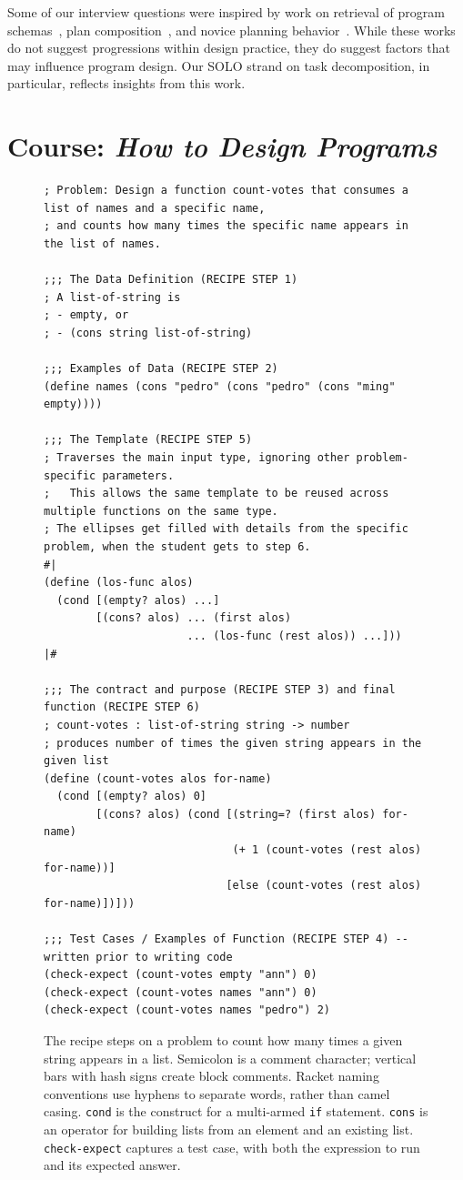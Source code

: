Some of our interview questions were inspired by work on retrieval of
program schemas~\cite{Pirolli_Anderson_1985,Spohrer_Soloway_1989},
plan composition~\cite{soloway-learning86}, and novice planning
behavior~\cite{Rist_1989,Rist_1991}.  While these works do not suggest
progressions within design practice, they do suggest factors that may
influence program design. Our SOLO strand on task decomposition, in
particular, reflects insights from this work.

\section{Course: \textit{How to Design Programs}}

\begin{figure}
\begin{lstlisting}
; Problem: Design a function count-votes that consumes a list of names and a specific name,
; and counts how many times the specific name appears in the list of names.

;;; The Data Definition (RECIPE STEP 1)
; A list-of-string is
; - empty, or
; - (cons string list-of-string)

;;; Examples of Data (RECIPE STEP 2)
(define names (cons "pedro" (cons "pedro" (cons "ming" empty))))

;;; The Template (RECIPE STEP 5)
; Traverses the main input type, ignoring other problem-specific parameters.
;   This allows the same template to be reused across multiple functions on the same type.
; The ellipses get filled with details from the specific problem, when the student gets to step 6.
#|
(define (los-func alos)
  (cond [(empty? alos) ...]
        [(cons? alos) ... (first alos)
                      ... (los-func (rest alos)) ...]))
|#

;;; The contract and purpose (RECIPE STEP 3) and final function (RECIPE STEP 6)
; count-votes : list-of-string string -> number
; produces number of times the given string appears in the given list
(define (count-votes alos for-name)
  (cond [(empty? alos) 0]
        [(cons? alos) (cond [(string=? (first alos) for-name)
                             (+ 1 (count-votes (rest alos) for-name))]
                            [else (count-votes (rest alos) for-name)])]))

;;; Test Cases / Examples of Function (RECIPE STEP 4) -- written prior to writing code
(check-expect (count-votes empty "ann") 0)
(check-expect (count-votes names "ann") 0)
(check-expect (count-votes names "pedro") 2)
\end{lstlisting}
\caption{The \htdp recipe steps on a problem to count how many times a given
  string appears in a list. Semicolon is a comment character; vertical
  bars with hash signs create block comments.  Racket naming
  conventions use hyphens to separate words, rather than
  camel casing. \lstinline{cond} is the construct for a multi-armed
  \lstinline{if} statement.  \lstinline{cons} is an operator for
  building lists from an element and an existing list.
  \lstinline{check-expect} captures a test case, with both the
  expression to run and its expected answer.}
\label{f:htdp}
\end{figure}

